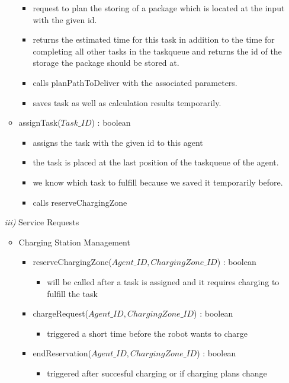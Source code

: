 \documentclass{article}
\begin{document}
\begin{enumerate}
\begin{itemize}
\begin{itemize}
			\item request to plan the storing of a package which is located at the input with the given id.
			\item returns the estimated time for this task in addition to the time for completing all other tasks in the taskqueue and returns the id of the storage the package should be stored at.
			\item calls planPathToDeliver with the associated parameters.
			\item saves task as well as calculation results temporarily.
		\end{itemize}
		\item assignTask($Task\_ID$) : boolean
		\begin{itemize}
			\item assigns the task with the given id to this agent
			\item the task is placed at the last position of the taskqueue of the agent.
			\item we know which task to fulfill because we saved it temporarily before.
			\item calls reserveChargingZone
		\end{itemize}
	\end{itemize}
	\item[\textit{iii)}] Service Requests
	\begin{itemize}
		\item Charging Station Management
		\begin{itemize}
			\item reserveChargingZone($Agent\_ID, ChargingZone\_ID$) : boolean
			\begin{itemize}
				\item will be called after a task is assigned and it requires charging to fulfill the task
			\end{itemize}
			\item chargeRequest($Agent\_ID, ChargingZone\_ID$) : boolean
			\begin{itemize}
				\item triggered a short time before the robot wants to charge
			\end{itemize}
			\item endReservation($Agent\_ID, ChargingZone\_ID$) : boolean
			\begin{itemize}
				\item triggered after succesful charging or if charging plans change
			\end{itemize}
		\end{itemize}

\end{itemize}
\end{enumerate}
\end{document}

